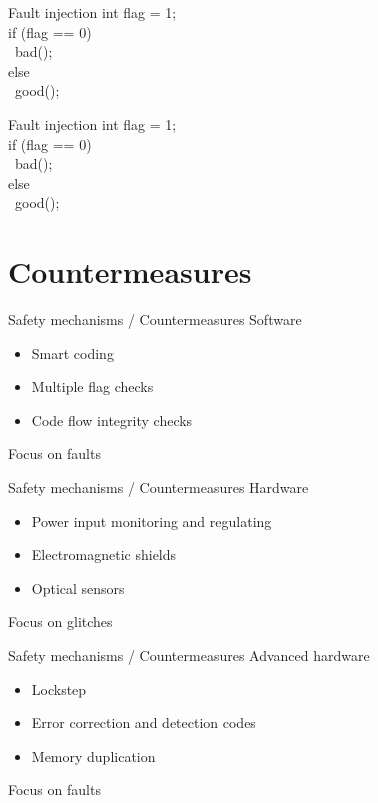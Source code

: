\documentclass[table]{beamer}
\begin{document}
\begin{frame}{Fault injection}
    int flag = 1; \\
    if (flag == 0) \\
    \     {\color{mygray}bad();} \\
    else \\
    \     good(); 
\end{frame}

\begin{frame}{Fault injection}
    int flag = 1; \\
    {\color{mygray}if (flag == 0) }\ \\
    \     bad(); \\
    else \\
    \     {\color{mygray}good();} 
\end{frame}

\section{Countermeasures}

\begin{frame}
    \tableofcontents[currentsection]
\end{frame}

\begin{frame}{Safety mechanisms / Countermeasures}
    Software
    \begin{itemize}
        \item Smart coding
        \item Multiple flag checks
        \item Code flow integrity checks
    \end{itemize}
    Focus on faults
\end{frame}

\begin{frame}{Safety mechanisms / Countermeasures}
    Hardware
    \begin{itemize}
        \item Power input monitoring and regulating
        \item Electromagnetic shields
        \item Optical sensors
    \end{itemize}
    Focus on glitches
\end{frame}

\begin{frame}{Safety mechanisms / Countermeasures}
    Advanced hardware
    \begin{itemize}
        \item Lockstep
        \item Error correction and detection codes
        \item Memory duplication
    \end{itemize}
    Focus on faults
\end{frame}
\end{document}
